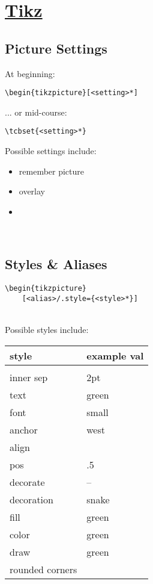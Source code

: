 \section{\href{http://mirrors.ctan.org/graphics/pgf/base/doc/pgfmanual.pdf}{Tikz}}

\subsection*{Picture Settings}
\begin{minipage}{6cm}
At beginning:\\
\begin{lstlisting}
\begin{tikzpicture}[<setting>*]
\end{lstlisting}
... or mid-course:\\
\begin{lstlisting}
\tcbset{<setting>*}
\end{lstlisting}
\end{minipage}

Possible settings include: 
\begin{itemize}
    \item remember picture
    \item overlay
    \item {}
\end{itemize}
\ \\

\subsection*{Styles \& Aliases}
\begin{code}{6}
\begin{lstlisting}
\begin{tikzpicture}
    [<alias>/.style={<style>*}]
\end{lstlisting}
\end{code} \\

Possible styles include: \\
\begin{tabularx}{5cm}{l l}
    style & example val \\
    \hline \\
    inner sep & 2pt\\
    text & green \\
    font & small \\
    anchor & west \\
    align & \\
    pos & .5 \\
    decorate & --\\
    decoration & snake \\
    fill & green \\
    color & green\\
    draw & green \\
    rounded corners & \\
\end{tabularx} \\

